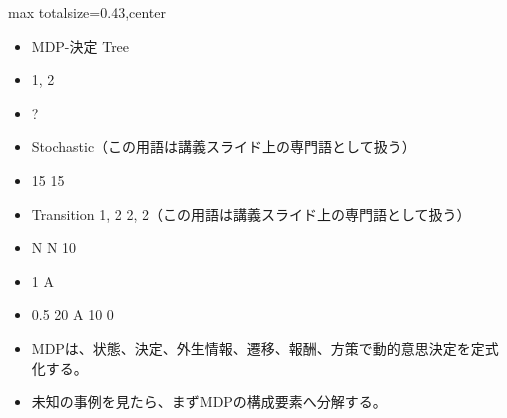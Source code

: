 \clearpage
{}
\begin{minipage}[t]{0.405\textwidth}
\begin{adjustbox}{max totalsize={\textwidth}{0.43\textheight},center}
\begin{minipage}{\textwidth}\scriptsize
{}\begin{itemize}
\item MDP-決定 Tree
\item 1, 2
\item ?
\item Stochastic（この用語は講義スライド上の専門語として扱う）
\item 15 15
\item Transition 1, 2 2, 2（この用語は講義スライド上の専門語として扱う）
\item N N 10
\item 1 A
\item 0.5 20 A 10 0
\end{itemize}\begin{itemize}
\item MDPは、状態、決定、外生情報、遷移、報酬、方策で動的意思決定を定式化する。
\item 未知の事例を見たら、まずMDPの構成要素へ分解する。
\end{itemize}
\end{minipage}
\end{adjustbox}
\end{minipage}\hfill
